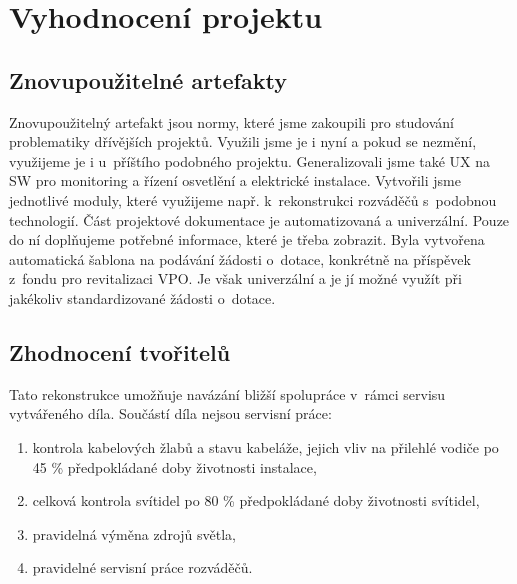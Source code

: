 \documentclass[a4paper, twoside, 11pt]{article}
\begin{document}
	
	
\section{Vyhodnocení projektu}
	\subsection{Znovupoužitelné artefakty}
		Znovupoužitelný artefakt jsou normy, které jsme zakoupili pro studování problematiky dřívějších projektů. Využili jsme je i nyní a pokud se nezmění, využijeme je i u~příštího podobného projektu. Generalizovali jsme také UX na SW pro monitoring a řízení osvetlění a elektrické instalace. Vytvořili jsme jednotlivé moduly, které využijeme např. k~rekonstrukci rozváděčů s~podobnou technologií. Část projektové dokumentace je automatizovaná a univerzální. Pouze do ní doplňujeme potřebné informace, které je třeba zobrazit.
		Byla vytvořena automatická šablona na podávání žádosti o~dotace, konkrétně na příspěvek z~fondu pro revitalizaci VPO. Je však univerzální a je jí možné využít při jakékoliv standardizované žádosti o~dotace.
	\subsection{Zhodnocení tvořitelů}
	
		Tato rekonstrukce umožňuje navázání bližší spolupráce v~rámci servisu vytvářeného díla. Součástí díla nejsou servisní práce:
		
		\begin{enumerate}
			\item kontrola kabelových žlabů a stavu kabeláže, jejich vliv na přilehlé vodiče po 45 \% předpokládané doby životnosti instalace,
			\item celková kontrola svítidel po 80 \% předpokládané doby životnosti svítidel,
			\item pravidelná výměna zdrojů světla,
			\item pravidelné servisní práce rozváděčů.
		\end{enumerate}%
		\vspace*{11pt}
\end{document}
